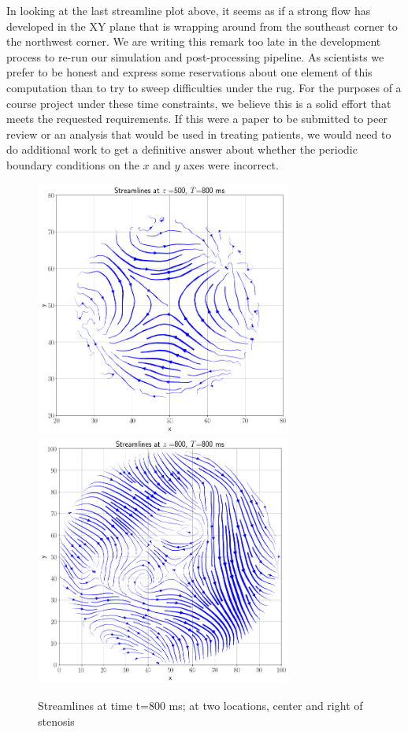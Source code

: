 \documentclass[11pt]{article} %
\begin{document}
In looking at the last streamline plot above, it seems as if a strong flow has developed
in the XY plane that is wrapping around from the southeast corner to the northwest corner.
We are writing this remark too late in the development process 
to re-run our simulation and post-processing pipeline.  
As scientists we prefer to be honest and express some reservations about one element of this
computation than to try to sweep difficulties under the rug.
For the purposes of a course project under these time constraints, we believe this is a 
solid effort that meets the requested requirements.  
If this were a paper to be submitted to peer review or an analysis that would be used
in treating patients, we would need to do additional work to get a definitive answer about
whether the periodic boundary conditions on the $x$ and $y$ axes were incorrect.

\begin{figure}
\centering
\hspace*{-0.25in}
\vspace*{-0.50in}
\includegraphics[width=0.75\textwidth]{streamlines/streamlines_z_500_t_800.png}
\includegraphics[width=0.75\textwidth]{streamlines/streamlines_z_800_t_800.png}
\caption{Streamlines at time t=800 ms; at two locations, center and right of stenosis}
\end{figure}
\end{document}

